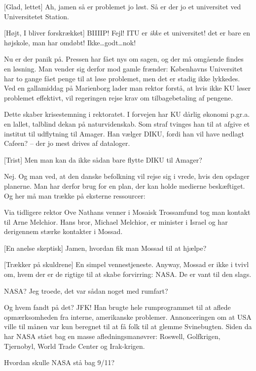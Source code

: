 \documentclass[a4paper,11pt]{article}
\begin{document}
\begin{sketch}
[Glad, lettet] Ah, jamen så er problemet jo løst. Så er der jo et
universitet ved Universitetet Station.

[Højt, I bliver forskrækket] BIIIIP! Fejl! ITU er \emph{ikke} et
universitet! det er bare en højskole, man har omdøbt!  Ikke\ldots godt\ldots nok!

Nu er der panik på. Pressen har fået nys om sagen, og der må omgående findes
en løsning. Man vender sig derfor mod gamle frænder: Københavns Universitet
har to gange fået penge til at løse problemet, men det er stadig ikke
lykkedes. Ved en gallamiddag på Marienborg lader man rektor forstå, at hvis
ikke KU løser problemet effektivt, vil regeringen rejse krav om
tilbagebetaling af pengene.

Dette skaber krisestemning i rektoratet. I forvejen har KU dårlig økonomi
p.gr.a. en lallet, talblind dekan på naturvidenskab. Som straf tvinges han til
at afgive et institut til udflytning til Amager. Han vælger DIKU, fordi han
vil have nedlagt Cafeen? -- der jo mest drives af dataloger.

[Trist] Men man kan da ikke sådan bare flytte DIKU til Amager?

 Nej. Og man ved, at den danske befolkning vil rejse sig i vrede, hvis
den opdager planerne. Man har derfor brug for en plan, der kan holde medierne
beskæftiget. Og her må man trække på eksterne ressourcer:

Via tidligere rektor Ove Nathans venner i Mosaisk Trossamfund tog man kontakt
til Arne Melchior. Hans bror, Michael Melchior, er minister i Israel og har
derigennem stærke kontakter i Mossad.

[En anelse skeptisk] Jamen, hvordan fik man Mossad til at hjælpe?

[Trækker på skuldrene] En simpel vennestjeneste. Anyway, Mossad er
ikke i tvivl om, hvem der er de rigtige til at skabe forvirring: NASA. De er
vant til den slags.

 NASA? Jeg troede, det var sådan noget med rumfart?

 Og hvem fandt på det? JFK! Han brugte hele rumprogrammet til at aflede
opmærksomheden fra interne, amerikanske problemer. Annonceringen om at USA ville
til månen var kun beregnet til at få folk til at glemme Svinebugten. Siden da har
NASA stået bag en masse afledningsmanøvrer: Roswell, Golfkrigen, Tjernobyl, World
Trade Center og Irak-krigen.

 Hvordan skulle NASA stå bag 9/11?


\end{sketch}
\end{document}
